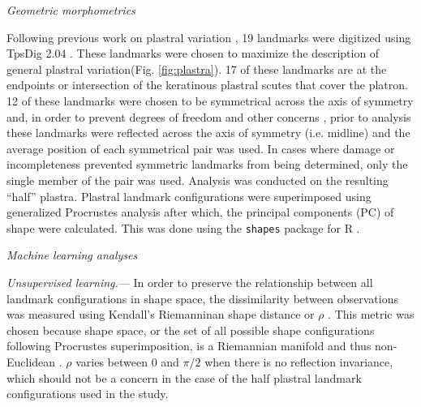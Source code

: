 \documentclass[12pt,letterpaper]{article}\usepackage{graphicx, color}
\renewcommand{\subsection}[1]{%
\bigskip
\begin{center}
\begin{large}
\normalfont\itshape #1
\end{large}
\end{center}}
\renewcommand{\subsubsection}[1]{%
\vspace{2ex}
\noindent
\textit{#1.}---}
\begin{document}
\subsection{Geometric morphometrics}
Following previous work on plastral variation \citep{Angielczyk2007,Angielczyk2011,Angielczyk2013a}, 19 landmarks were digitized using TpsDig 2.04 \citep{Rohlf2005}. These landmarks were chosen to maximize the description of general plastral variation(Fig. \ref{fig:plastra}). 17 of these landmarks are at the endpoints or intersection of the keratinous plastral scutes that cover the platron. 12 of these landmarks were chosen to be symmetrical across the axis of symmetry and, in order to prevent degrees of freedom and other concerns \citep{Klingenberg2002}, prior to analysis these landmarks were reflected across the axis of symmetry (i.e. midline) and the average position of each symmetrical pair was used. In cases where damage or incompleteness prevented symmetric landmarks from being determined, only the single member of the pair was used. Analysis was conducted on the resulting ``half'' plastra.
Plastral landmark configurations were superimposed using generalized Procrustes analysis \citep{Dryden1998a} after which, the principal components (PC) of shape were calculated. This was done using the \texttt{shapes} package for R \citep{2013,Dryden2013}.


\subsection{Machine learning analyses}
\subsubsection{Unsupervised learning}
In order to preserve the relationship between all landmark configurations in shape space, the dissimilarity between observations was measured using Kendall's Riemanninan shape distance or \(\rho\) \citep{Kendall1984a,Dryden1998a}. This metric was chosen because shape space, or the set of all possible shape configurations following Procrustes superimposition, is a Riemannian manifold and thus non-Euclidean \citep{Dryden1998a}. \(\rho\) varies between 0 and \(\pi / 2\) when there is no reflection invariance, which should not be a concern in the case of the half plastral landmark configurations used in the study.
\end{document}
